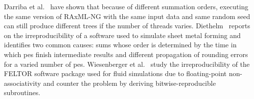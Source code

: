 Darriba et al.~\cite{darriba_state_2018} have shown that because of different summation orders, executing the same version of RAxML-NG with the same input data and same random seed can still produce different trees if the number of threads varies.
Diethelm~\cite{diethelm_limits_2012} reports on the irreproducibility of a software used to simulate sheet metal forming and identifies two common causes: sums whose order is determined by the time in which \glspl{pe} finish intermediate results and different propagation of rounding errors for a varied number of \glspl{pe}.
Wiesenberger et al.~\cite{wiesenberger_reproducibility_2019} study the irreproducibility of the \textsc{FELTOR} software package used for fluid simulations due to floating-point non-associativity and counter the problem by deriving bitwise-reproducible subroutines.
